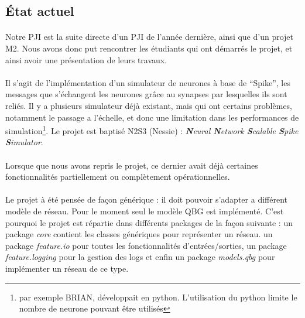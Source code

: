 \documentclass[a4paper,10pt]{article}
\begin{document}
\newpage

\subsection{État actuel}

\paragraph{}
Notre PJI est la suite directe d’un PJI de l’année dernière, ainsi que d’un projet M2. Nous avons donc put rencontrer les étudiants qui ont démarrés le projet, et ainsi avoir une présentation de leurs travaux.

\paragraph{}
Il s’agit de l’implémentation d’un simulateur de neurones à base de “Spike”, les messages que s’échangent les neurones grâce au synapses par lesquelles ils sont reliés. Il y a plusieurs simulateur déjà existant, mais qui  ont certains problèmes, notamment le passage a l’échelle, et donc une limitation dans les performances de simulation\footnote{par exemple BRIAN, développait en python. L'utilisation du python limite le nombre de neurone pouvant être utilisés}. Le projet est baptisé N2S3 (Nessie) : \emph{\textbf{N}eural \textbf{N}etwork \textbf{S}calable
\textbf{S}pike \textbf{S}imulator}.

\paragraph{}
Lorsque que nous avons repris le projet, ce dernier avait déjà certaines fonctionnalités partiellement ou complètement opérationnelles.

\paragraph{}
Le projet à été pensée de façon générique : il doit pouvoir s’adapter a différent modèle de réseau. Pour le moment seul le modèle QBG est implémenté. C’est pourquoi le projet est répartie dans différents packages de la façon suivante : un package \emph{core} contient les classes génériques pour représenter un réseau. un package \emph{feature.io} pour toutes les fonctionnalités d’entrées/sorties, un package \emph{feature.logging} pour la gestion des logs et enfin un package \emph{models.qbg} pour implémenter un réseau de ce type.
\end{document}

